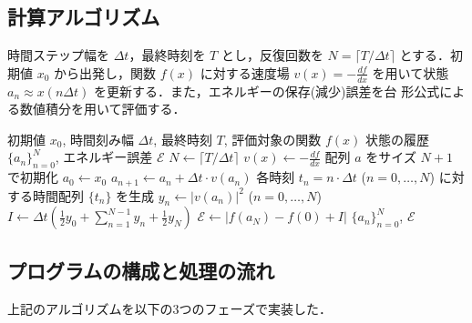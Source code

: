   \subsection{計算アルゴリズム}
  
  時間ステップ幅を $\Delta t$，最終時刻を $T$ とし，反復回数を $N =
  \lceil T / \Delta t \rceil$ とする．初期値 $x_0$ から出発し，関数
  $f(x)$ に対する速度場 $v(x) = - \frac{df}{dx}$ を用いて状態 $a_n
  \approx x(n\Delta t)$ を更新する．また，エネルギーの保存(減少)誤差を台
  形公式による数値積分を用いて評価する．
  
  \begin{algorithm}[H]
   \caption{前進オイラー法による軌道計算とエネルギー変化の検証}
   \label{alg:forward_euler}
   \begin{algorithmic}[1]
    \REQUIRE 初期値 $x_0$, 時間刻み幅 $\Delta t$, 最終時刻 $T$, 評価対象の関数 $f(x)$
    \ENSURE 状態の履歴 $\{a_n\}_{n=0}^N$, エネルギー誤差 $\mathcal{E}$
    \STATE $N \leftarrow \lceil T / \Delta t \rceil$ 
    \STATE $v(x) \leftarrow - \frac{df}{dx}$ 
    \STATE 配列 $a$ をサイズ $N+1$ で初期化
    \STATE $a_0 \leftarrow x_0$ 
    \STATE $a_{n+1} \leftarrow a_n + \Delta t \cdot v(a_n)$ 
    \ENDFOR
    \STATE 各時刻 $t_n = n \cdot \Delta t$ ($n=0, \dots, N$) に対する時間配列 $\{t_n\}$ を生成
    \STATE $y_n \leftarrow |v(a_n)|^2$ ($n=0, \dots, N$) 
    \STATE $I \leftarrow \Delta t \left( \frac{1}{2}y_0 + \sum_{n=1}^{N-1} y_n + \frac{1}{2}y_N \right)$ 
    \STATE $\mathcal{E} \leftarrow \left| f(a_N) - f(0) + I \right|$ 
\RETURN $\{a_n\}_{n=0}^N$, $\mathcal{E}$
   \end{algorithmic}
  \end{algorithm}

  \subsection{プログラムの構成と処理の流れ}

  上記のアルゴリズムを以下の3つのフェーズで実装した．
  
